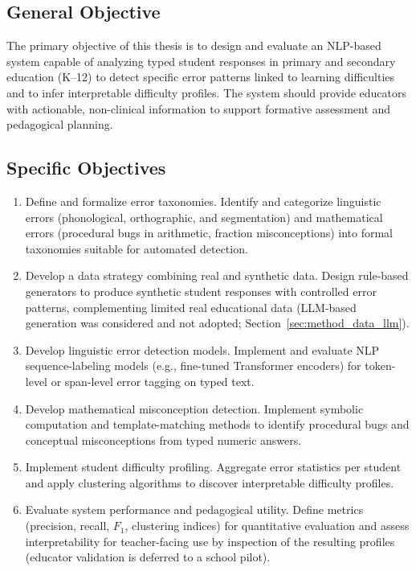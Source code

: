 \subsection{General Objective}
The primary objective of this thesis is to design and evaluate an NLP-based system capable of analyzing typed student responses in primary and secondary education (K--12) to detect specific error patterns linked to learning difficulties and to infer interpretable difficulty profiles. The system should provide educators with actionable, non-clinical information to support formative assessment and pedagogical planning.

\subsection{Specific Objectives}
\begin{enumerate}
    \item[\textbf{O1}] Define and formalize error taxonomies. Identify and categorize linguistic errors (phonological, orthographic, and segmentation) and mathematical errors (procedural bugs in arithmetic, fraction misconceptions) into formal taxonomies suitable for automated detection.
    \item[\textbf{O2}] Develop a data strategy combining real and synthetic data. Design rule-based generators to produce synthetic student responses with controlled error patterns, complementing limited real educational data (LLM-based generation was considered and not adopted; Section~\ref{sec:method_data_llm}).
    \item[\textbf{O3}] Develop linguistic error detection models. Implement and evaluate NLP sequence-labeling models (e.g., fine-tuned Transformer encoders) for token-level or span-level error tagging on typed text.
    \item[\textbf{O4}] Develop mathematical misconception detection. Implement symbolic computation and template-matching methods to identify procedural bugs and conceptual misconceptions from typed numeric answers.
    \item[\textbf{O5}] Implement student difficulty profiling. Aggregate error statistics per student and apply clustering algorithms to discover interpretable difficulty profiles.
    \item[\textbf{O6}] Evaluate system performance and pedagogical utility. Define metrics (precision, recall, \(F_1\), clustering indices) for quantitative evaluation and assess interpretability for teacher-facing use by inspection of the resulting profiles (educator validation is deferred to a school pilot).
\end{enumerate}

